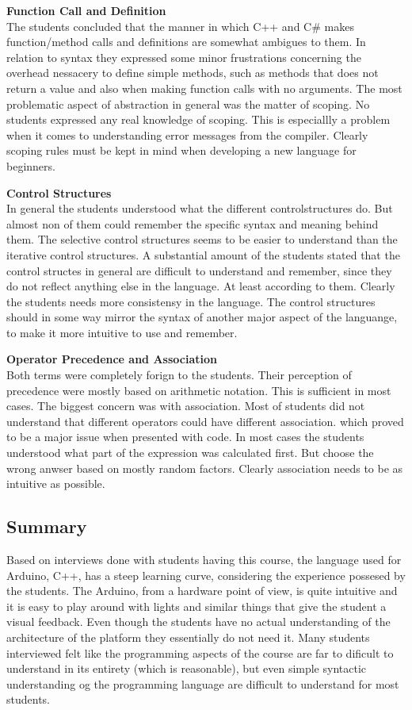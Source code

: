 \textbf{Function Call and Definition}\\
The students concluded that the manner in which C++ and C{\#} makes function/method calls and definitions are somewhat ambigues to them. In relation to syntax they expressed some minor frustrations concerning the overhead nessacery to define simple methods, such as methods that does not return a value and also when making function calls with no arguments. The most problematic aspect of abstraction in general was the matter of scoping. No students expressed any real knowledge of scoping. This is especiallly a problem when it comes to understanding error messages from the compiler. Clearly scoping rules must be kept in mind when developing a new language for beginners.

\textbf{Control Structures}\\
In general the students understood what the different controlstructures do. But almost non of them could remember the specific syntax and meaning behind them. The selective control structures seems to be easier to understand than the iterative control structures. A substantial amount of the students stated that the control structes in general are difficult to understand and remember, since they do not reflect anything else in the language. At least according to them.
Clearly the students needs more consistensy in the language. The control structures should in some way mirror the syntax of another major aspect of the languange, to make it more intuitive to use and remember.

\textbf{Operator Precedence and Association}\\
Both terms were completely forign to the students. Their perception of precedence were mostly based on arithmetic notation. This is sufficient in most cases. The biggest concern was with association. Most of students did not understand that different operators could have different association. which proved to be a major issue when presented with code. In most cases the students understood what part of the expression was calculated first. But choose the wrong anwser based on mostly random factors. Clearly association needs to be as intuitive as possible.

\subsection{Summary}
Based on interviews done with students having this course, the language used for Arduino, C++, has a steep learning curve, considering the experience possesed by the students. The Arduino, from a hardware point of view, is quite intuitive and it is easy to play around with lights and similar things that give the student a visual feedback. Even though the students have no actual understanding of the architecture of the platform they essentially do not need it. Many students interviewed felt like the programming aspects of the course are far to dificult to understand in its entirety (which is reasonable), but even simple syntactic understanding og the programming language are difficult to understand for most students. 
\cite{Interviews}%


